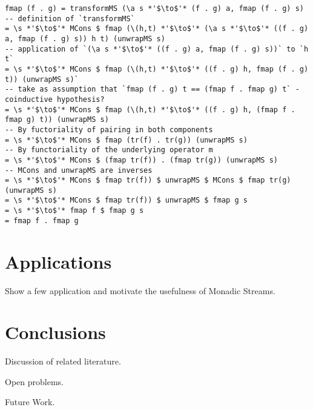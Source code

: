 \documentclass{article}
\begin{document}
\begin{lstlisting}
fmap (f . g) = transformMS (\a s *'$\to$'* (f . g) a, fmap (f . g) s)
-- definition of `transformMS`
= \s *'$\to$'* MCons $ fmap (\(h,t) *'$\to$'* (\a s *'$\to$'* ((f . g) a, fmap (f . g) s)) h t) (unwrapMS s)
-- application of `(\a s *'$\to$'* ((f . g) a, fmap (f . g) s))` to `h t`
= \s *'$\to$'* MCons $ fmap (\(h,t) *'$\to$'* ((f . g) h, fmap (f . g) t)) (unwrapMS s)`
-- take as assumption that `fmap (f . g) t == (fmap f . fmap g) t` - coinductive hypothesis?
= \s *'$\to$'* MCons $ fmap (\(h,t) *'$\to$'* ((f . g) h, (fmap f . fmap g) t)) (unwrapMS s)
-- By fuctoriality of pairing in both components
= \s *'$\to$'* MCons $ fmap (tr(f) . tr(g)) (unwrapMS s)
-- By functoriality of the underlying operator m
= \s *'$\to$'* MCons $ (fmap tr(f)) . (fmap tr(g)) (unwrapMS s)
-- MCons and unwrapMS are inverses
= \s *'$\to$'* MCons $ fmap tr(f)) $ unwrapMS $ MCons $ fmap tr(g) (unwrapMS s)
= \s *'$\to$'* MCons $ fmap tr(f)) $ unwrapMS $ fmap g s
= \s *'$\to$'* fmap f $ fmap g s
= fmap f . fmap g
\end{lstlisting}

\section{Applications}

Show a few application and motivate the usefulness of Monadic Streams.

\section{Conclusions}

Discussion of related literature.

Open problems.

Future Work.


\end{document}
